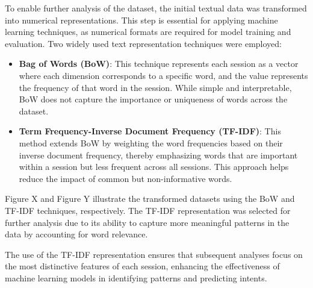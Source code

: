         To enable further analysis of the dataset, the initial textual data was transformed into numerical representations. This step is essential for applying machine learning techniques, as numerical formats are required for model training and evaluation. Two widely used text representation techniques were employed:

        \begin{itemize}
            \item \textbf{Bag of Words (BoW)}: This technique represents each session as a vector where each dimension corresponds to a specific word, and the value represents the frequency of that word in the session. While simple and interpretable, BoW does not capture the importance or uniqueness of words across the dataset.
            \item \textbf{Term Frequency-Inverse Document Frequency (TF-IDF)}: This method extends BoW by weighting the word frequencies based on their inverse document frequency, thereby emphasizing words that are important within a session but less frequent across all sessions. This approach helps reduce the impact of common but non-informative words.
        \end{itemize}

        Figure X and Figure Y illustrate the transformed datasets using the BoW and TF-IDF techniques, respectively. The TF-IDF representation was selected for further analysis due to its ability to capture more meaningful patterns in the data by accounting for word relevance.


        The use of the TF-IDF representation ensures that subsequent analyses focus on the most distinctive features of each session, enhancing the effectiveness of machine learning models in identifying patterns and predicting intents.
        
    \clearpage %
